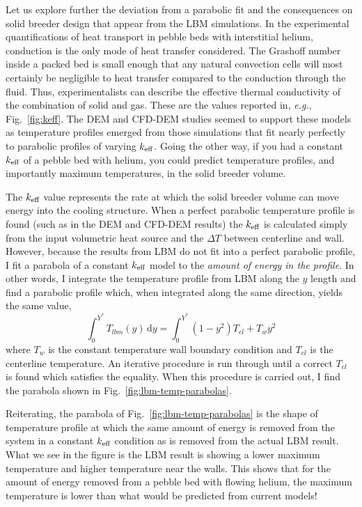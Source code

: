 Let us explore further the deviation from a parabolic fit and the consequences on solid breeder design that appear from the LBM simulations. In the experimental quantifications of heat transport in pebble beds with interstitial helium, conduction is the only mode of heat transfer considered. The Grashoff number inside a packed bed is small enough that any natural convection cells will most certainly be negligible to heat transfer compared to the conduction through the fluid. Thus, experimentalists can describe the effective thermal conductivity of the combination of solid and gas. These are the values reported in, \textit{e.g.}, Fig.~\ref{fig:keff}. The DEM and CFD-DEM studies seemed to support these models as temperature profiles emerged from those simulations that fit nearly perfectly to parabolic profiles of varying $k_\text{eff}$. Going the other way, if you had a constant $k_\text{eff}$ of a pebble bed with helium, you could predict temperature profiles, and importantly maximum temperatures, in the solid breeder volume. 

The $k_\text{eff}$ value represents the rate at which the solid breeder volume can move energy into the cooling structure. When a perfect parabolic temperature profile is found (such as in the DEM and CFD-DEM results) the $k_\text{eff}$ is calculated simply from the input volumetric heat source and the $\Delta T$ between centerline and wall. However, because the results from LBM do not fit into a perfect parabolic profile, I fit a parabola of a constant $k_\text{eff}$ model to the \textit{amount of energy in the profile}. In other words, I integrate the temperature profile from LBM along the $y$ length and find a parabolic profile which, when integrated along the same direction, yields the same value,
\begin{equation}
    \int_0^{Y^*} T_{lbm}(y)\,\mathrm{d}y = \int_0^{Y^*} (1-y^2)T_{cl} + T_w y^2
\end{equation}
where $T_w$ is the constant temperature wall boundary condition and $T_{cl}$ is the centerline temperature. An iterative procedure is run through until a correct $T_{cl}$ is found which satisfies the equality. When this procedure is carried out, I find the parabola shown in Fig.~\ref{fig:lbm-temp-parabolas}.

Reiterating, the parabola of Fig.~\ref{fig:lbm-temp-parabolas} is the shape of temperature profile at which the same amount of energy is removed from the system in a constant $k_\text{eff}$ condition as is removed from the actual LBM result. What we see in the figure is the LBM result is showing a lower maximum temperature and higher temperature near the walls. This shows that for the amount of energy removed from a pebble bed with flowing helium, the maximum temperature is lower than what would be predicted from current models!

